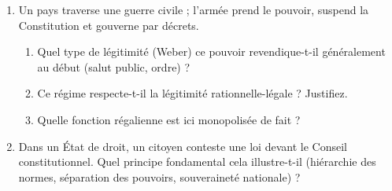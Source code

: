 \documentclass[11pt]{article}
\begin{document}
\begin{exercice}
\begin{enumerate}
    \item Un pays traverse une guerre civile ; l'armée prend le pouvoir, suspend la Constitution et gouverne par décrets.
    \begin{enumerate}
        \item Quel type de légitimité (Weber) ce pouvoir revendique-t-il généralement au début (salut public, ordre) ?
        \item Ce régime respecte-t-il la légitimité rationnelle-légale ? Justifiez.
        \item Quelle fonction régalienne est ici monopolisée de fait ?
    \end{enumerate}
    \item Dans un État de droit, un citoyen conteste une loi devant le Conseil constitutionnel. Quel principe fondamental cela illustre-t-il (hiérarchie des normes, séparation des pouvoirs, souveraineté nationale) ?
\end{enumerate}
\end{exercice}
\end{document}
